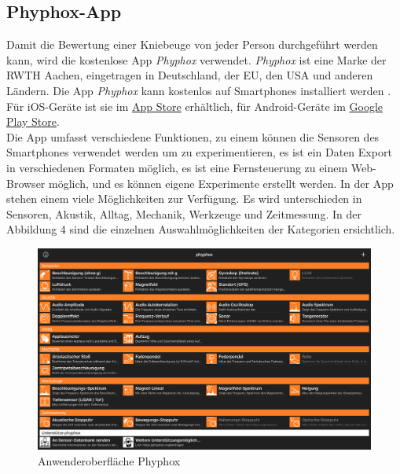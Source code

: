 \subsection{Phyphox-App}
Damit die Bewertung einer Kniebeuge von jeder Person durchgeführt werden kann, wird die kostenlose App \textit{Phyphox} verwendet. \textit{Phyphox} ist eine Marke der RWTH Aachen, eingetragen in Deutschland, der EU, den USA und anderen Ländern. \noindent Die App \textit{Phyphox} kann kostenlos auf Smartphones installiert werden \cite{phyphoxDownload}. 
Für iOS-Geräte ist sie im \href{https://apps.apple.com/us/app/phyphox/id1127319693?l=de&ls=1}{App Store} erhältlich, 
für Android-Geräte im \href{https://play.google.com/store/apps/details?id=de.rwth_aachen.phyphox}{Google Play Store}.
\\
\noindent Die App umfasst verschiedene Funktionen, zu einem können die Sensoren des Smartphones verwendet werden um zu experimentieren, es ist ein Daten Export in verschiedenen Formaten möglich, es ist eine Fernsteuerung zu einem Web-Browser möglich, und es können eigene Experimente erstellt werden. In der App stehen einem viele Möglichkeiten zur Verfügung. Es wird unterschieden in Sensoren, Akustik, Alltag, Mechanik, Werkzeuge und Zeitmessung. In der Abbildung 4 sind die einzelnen Auswahlmöglichkeiten der Kategorien ersichtlich. \cite{Phyphox}
\begin{figure}[ht]\centering
\includegraphics[width=\linewidth]{images/Phyphox.jpeg}
\caption{Anwenderoberfläche Phyphox \cite{Phyphox}}
\label{fig:Anwenderoberfläche Phyphox}
\end{figure}

